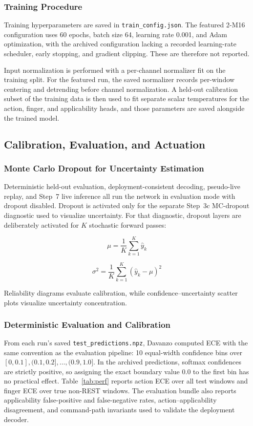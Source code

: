 \documentclass[conference]{IEEEtran}
\begin{document}
\subsubsection{Training Procedure}
Training hyperparameters are saved in \texttt{train\_config.json}. The featured 2-M16 configuration uses 60 epochs, batch size 64, learning rate 0.001, and Adam optimization, with the archived configuration lacking a recorded learning-rate scheduler, early stopping, and gradient clipping. These are therefore not reported.

Input normalization is performed with a per-channel normalizer fit on the training split. For the featured run, the saved normalizer records per-window centering and detrending before channel normalization. A held-out calibration subset of the training data is then used to fit separate scalar temperatures for the action, finger, and applicability heads, and those parameters are saved alongside the trained model.

\subsection{Calibration, Evaluation, and Actuation}
\subsubsection{Monte Carlo Dropout for Uncertainty Estimation}

Deterministic held-out evaluation, deployment-consistent decoding, pseudo-live replay, and Step~7 live inference all run the network in evaluation mode with dropout disabled. Dropout is activated only for the separate Step~3c MC-dropout diagnostic used to visualize uncertainty. For that diagnostic, dropout layers are deliberately activated for \(K\) stochastic forward passes:

\[
\mu = \frac{1}{K}\sum_{k=1}^{K}\hat{y}_k
\]

\[
\sigma^2 = \frac{1}{K}\sum_{k=1}^{K}(\hat{y}_k - \mu)^2
\]

Reliability diagrams evaluate calibration, while confidence--uncertainty scatter plots visualize uncertainty concentration.

\subsubsection{Deterministic Evaluation and Calibration}
From each run's saved \texttt{test\_predictions.npz}, Davanzo computed ECE with the same convention as the evaluation pipeline: 10 equal-width confidence bins over $[0, 0.1], (0.1, 0.2], \ldots, (0.9, 1.0]$. In the archived predictions, softmax confidences are strictly positive, so assigning the exact boundary value 0.0 to the first bin has no practical effect. Table~\ref{tab:perf} reports action ECE over all test windows and finger ECE over true non-REST windows. The evaluation bundle also reports applicability false-positive and false-negative rates, action--applicability disagreement, and command-path invariants used to validate the deployment decoder.
\end{document}
